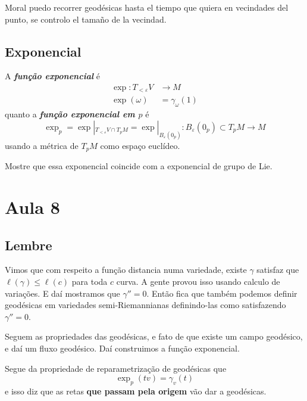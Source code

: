 \begin{thing8}{Moral}\leavevmode
puedo recorrer geodésicas hasta el tiempo que quiera en vecindades del punto, se controlo el tamaño de la vecindad.
\end{thing8}

\subsection{Exponencial}

\begin{defn}\leavevmode
	A \textit{\textbf{função exponencial}} é
\begin{align*}
	\operatorname{exp}: T_{<\varepsilon}V  &\longrightarrow M \\
	\operatorname{exp}(\omega) &= \gamma_\omega(1)
\end{align*}
quanto a \textit{\textbf{função exponencial em \(p\)}} é
\[\operatorname{exp}_p=\operatorname{exp}|_{T_{<\varepsilon }V \cap T_p M}=\operatorname{exp}|_{B_\varepsilon(0_p)}:B_\varepsilon(0_p) \subset T_pM \longrightarrow M\]
usando a métrica de \(T_pM\) como espaço euclídeo.
\end{defn}

\begin{exercise}\leavevmode
Mostre que essa exponencial coincide com a exponencial de grupo de Lie.
\end{exercise}

\section{Aula 8}

\subsection{Lembre}

Vimos que com respeito a função distancia numa variedade, existe \(\gamma\) satisfaz que \(\ell(\gamma) \leq  \ell(c)\) para toda \(c\) curva. A gente provou isso usando calculo de variações. E daí mostramos que \(\gamma''=0\). Então fica que também podemos definir geodésicas em variedades semi-Riemannianas definindo-las como satisfazendo \(\gamma''=0\).

Seguem as propriedades das geodésicas, e fato de que existe um campo geodésico, e daí um fluxo geodésico. Daí construimos a função exponencial.

Segue da propriedade de reparametrização de geodésicas que
\[\operatorname{exp}_p(tv)=\gamma_v(t)\]
e isso diz que as retas \textbf{que passam pela origem} vão dar a geodésicas.


